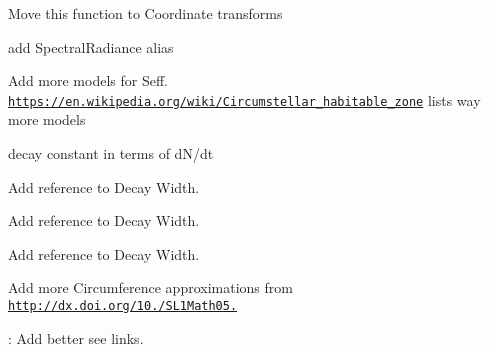 
\begin{DoxyRefList}
\item[\label{todo__todo000007}%
\Hypertarget{todo__todo000007}%
Member \mbox{\hyperlink{group___e_g_x_math-_conversions-_coordinate_conversions-3_d-_spherical_gaa9b50c4837e1cbea569de6f7bc90a3b6}{E\+G\+X\+Math\+:\+:Spherical\+Cordinates\+Of\+Point\+Given\+Center}} (const T centerR, const T center\+Azimuth\+In\+Radians, const T center\+Zenith\+In\+Radians, const T pointR, const T point\+Azimuth\+In\+Radians, const T poin\+Zenith\+In\+Radians, T \&shiftedR, T \&shifted\+Azimuth\+In\+Radians, T \&shifted\+Zenith\+In\+Radians)]Move this function to Coordinate transforms  
\item[\label{todo__todo000009}%
\Hypertarget{todo__todo000009}%
Namespace \mbox{\hyperlink{namespace_e_g_x_phys}{E\+G\+X\+Phys}} ]add Spectral\+Radiance alias  
\item[\label{todo__todo000001}%
\Hypertarget{todo__todo000001}%
Module \mbox{\hyperlink{group___e_g_x_phys-_circumstellar_habitable_zone_limit}{E\+G\+X\+Phys-\/\+Circumstellar\+Habitable\+Zone\+Limit}} ]Add more models for Seff. \href{https://en.wikipedia.org/wiki/Circumstellar_habitable_zone}{\tt https\+://en.\+wikipedia.\+org/wiki/\+Circumstellar\+\_\+habitable\+\_\+zone} lists way more models  
\item[\label{todo__todo000002}%
\Hypertarget{todo__todo000002}%
Module \mbox{\hyperlink{group___e_g_x_phys-_decay_constant}{E\+G\+X\+Phys-\/\+Decay\+Constant}} ]decay constant in terms of d\+N/dt  
\item[\label{todo__todo000003}%
\Hypertarget{todo__todo000003}%
Module \mbox{\hyperlink{group___e_g_x_phys-_half_life}{E\+G\+X\+Phys-\/\+Half\+Life}} ]Add reference to Decay Width.  
\item[\label{todo__todo000004}%
\Hypertarget{todo__todo000004}%
Module \mbox{\hyperlink{group___e_g_x_phys-_nuclear_binding_energy}{E\+G\+X\+Phys-\/\+Nuclear\+Binding\+Energy}} ]Add reference to Decay Width.  
\item[\label{todo__todo000006}%
\Hypertarget{todo__todo000006}%
Module \mbox{\hyperlink{group___e_g_x_phys-_semi_empirical_mass_formula}{E\+G\+X\+Phys-\/\+Semi\+Empirical\+Mass\+Formula}} ]Add reference to Decay Width.  
\item[\label{todo__todo000008}%
\Hypertarget{todo__todo000008}%
File \mbox{\hyperlink{_ellipse_circumference_8hpp}{Ellipse\+Circumference.hpp}} ]Add more Circumference approximations from \href{http://dx.doi.org/10.3247/SL1Math05.004}{\tt http\+://dx.\+doi.\+org/10./\+S\+L1\+Math05.}  
\item[\label{todo__todo000005}%
\Hypertarget{todo__todo000005}%
File \mbox{\hyperlink{_nuclear_separation_energy_8hpp}{Nuclear\+Separation\+Energy.hpp}} ]\+: Add better see links. 
\end{DoxyRefList}